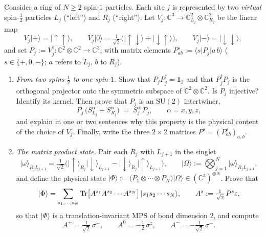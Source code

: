 \begin{problem}
Consider a ring of $N \geq 2$ spin-$1$ particles. Each site $j$ is represented by two \emph{virtual} spin-$\tfrac12$ particles $L_j$ (``left'') and $R_j$ (``right''). Let $V_j : \mathbb{C}^3 \to \mathbb{C}^2_{L_j}\otimes\mathbb{C}^2_{R_j}$ be the linear map
\[
  V_j\lvert{+}\rangle = \lvert\uparrow\uparrow\rangle, \qquad
  V_j\lvert 0\rangle = \tfrac{1}{\sqrt2}\big(\lvert\uparrow\downarrow\rangle + \lvert\downarrow\uparrow\rangle\big), \qquad
  V_j\lvert{-}\rangle = \lvert\downarrow\downarrow\rangle,
\]
and set $P_j := V_j^{\dagger} : \mathbb{C}^2\otimes\mathbb{C}^2 \to \mathbb{C}^3$, with matrix elements $P^{s}_{ab} := \langle s\rvert P_j\lvert a\,b\rangle$ ($s \in \{+,0,-\}$; $a$ refers to $L_j$, $b$ to $R_j$).

\begin{enumerate}[label=\textbf{(\alph*)}]
  \item \emph{From two spins-$\tfrac12$ to one spin-$1$.}
        Show that $P_jP_j^{\dagger} = \mathbf{1}_{3}$ and that $P_j^{\dagger}P_j$ is the orthogonal projector onto the symmetric subspace of $\mathbb{C}^2\otimes\mathbb{C}^2$. Is $P_j$ injective? Identify its kernel.
        Then prove that $P_j$ is an $\mathrm{SU}(2)$ intertwiner,
        \[
          P_j\,\big(S^{\alpha}_{L_j} + S^{\alpha}_{R_j}\big) \;=\; S^{\alpha}_{j}\,P_j, \qquad \alpha = x,y,z,
        \]
        and explain in one or two sentences why this property is the physical content of the choice of $V_j$. Finally, write the three $2\times2$ matrices $P^{s} = (P^{s}_{ab})_{a,b}$.

  \item \emph{The matrix product state.}
        Pair each $R_j$ with $L_{j+1}$ in the singlet
        \[
          \lvert\omega\rangle_{R_j L_{j+1}} = \tfrac{1}{\sqrt2}\big(\lvert\uparrow\rangle_{R_j}\lvert\downarrow\rangle_{L_{j+1}} - \lvert\downarrow\rangle_{R_j}\lvert\uparrow\rangle_{L_{j+1}}\big),
          \qquad
          \lvert\Omega\rangle := \bigotimes_{j=1}^{N} \lvert\omega\rangle_{R_j L_{j+1}},
        \]
        and define the physical state $\lvert\Phi\rangle := \big(P_1\otimes\cdots\otimes P_N\big)\lvert\Omega\rangle \in (\mathbb{C}^3)^{\otimes N}$.
        Prove that
        \[
          \lvert\Phi\rangle = \sum_{s_1,\dots,s_N} \operatorname{Tr}\!\big[A^{s_1}A^{s_2}\cdots A^{s_N}\big]\,\lvert s_1 s_2\cdots s_N\rangle,
          \qquad
          A^{s} := \tfrac{1}{\sqrt2}\,P^{s}\varepsilon,
        \]
        so that $\lvert\Phi\rangle$ is a translation-invariant MPS of bond dimension $2$, and compute
        \[
          A^{+} = \tfrac{1}{\sqrt2}\,\sigma^{+}, \qquad A^{0} = -\tfrac12\,\sigma^{z}, \qquad A^{-} = -\tfrac{1}{\sqrt2}\,\sigma^{-}.
        \]


\end{enumerate}
\end{problem}
